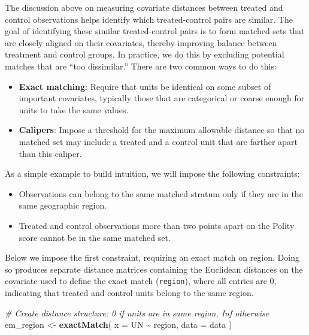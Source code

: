 \documentclass[
  12pt,
  leqno]{article}
\newenvironment{Shaded}{\begin{snugshade}}{\end{snugshade}}
\newcommand{\AttributeTok}[1]{\textcolor[rgb]{0.13,0.29,0.53}{#1}}
\newcommand{\CommentTok}[1]{\textcolor[rgb]{0.56,0.35,0.01}{\textit{#1}}}
\newcommand{\FunctionTok}[1]{\textcolor[rgb]{0.13,0.29,0.53}{\textbf{#1}}}
\newcommand{\NormalTok}[1]{#1}
\newcommand{\OtherTok}[1]{\textcolor[rgb]{0.56,0.35,0.01}{#1}}
\newcommand{\SpecialCharTok}[1]{\textcolor[rgb]{0.81,0.36,0.00}{\textbf{#1}}}
\providecommand{\tightlist}{%
  \setlength{\itemsep}{0pt}\setlength{\parskip}{0pt}}
\def\tightlist{}
\begin{document}
The discussion above on measuring covariate distances between treated
and control observations helps identify which treated-control pairs are
similar. The goal of identifying these similar treated-control pairs is
to form matched sets that are closely aligned on their covariates,
thereby improving balance between treatment and control groups. In
practice, we do this by excluding potential matches that are ``too
dissimilar.'' There are two common ways to do this:

\begin{itemize}
\tightlist
\item
  \textbf{Exact matching}: Require that units be identical on some
  subset of important covariates, typically those that are categorical
  or coarse enough for units to take the same values.
\item
  \textbf{Calipers}: Impose a threshold for the maximum allowable
  distance so that no matched set may include a treated and a control
  unit that are farther apart than this caliper.
\end{itemize}

As a simple example to build intuition, we will impose the following
constraints:

\begin{itemize}
\tightlist
\item
  Observations can belong to the same matched stratum only if they are
  in the same geographic region.
\item
  Treated and control observations more than two points apart on the
  Polity score cannot be in the same matched set.
\end{itemize}

Below we impose the first constraint, requiring an exact match on
region. Doing so produces separate distance matrices containing the
Euclidean distances on the covariate used to define the exact match
(\texttt{region}), where all entries are \(0\), indicating that treated
and control units belong to the same region.

\singlespacing

\begin{Shaded}
\begin{Highlighting}[]
\CommentTok{\# Create distance structure: 0 if units are in same region, Inf otherwise}
\NormalTok{em\_region }\OtherTok{\textless{}{-}} \FunctionTok{exactMatch}\NormalTok{(}
  \AttributeTok{x =}\NormalTok{ UN }\SpecialCharTok{\textasciitilde{}}\NormalTok{ region,}
  \AttributeTok{data =}\NormalTok{ data}
\NormalTok{)}
\end{Highlighting}
\end{Shaded}
\end{document}
